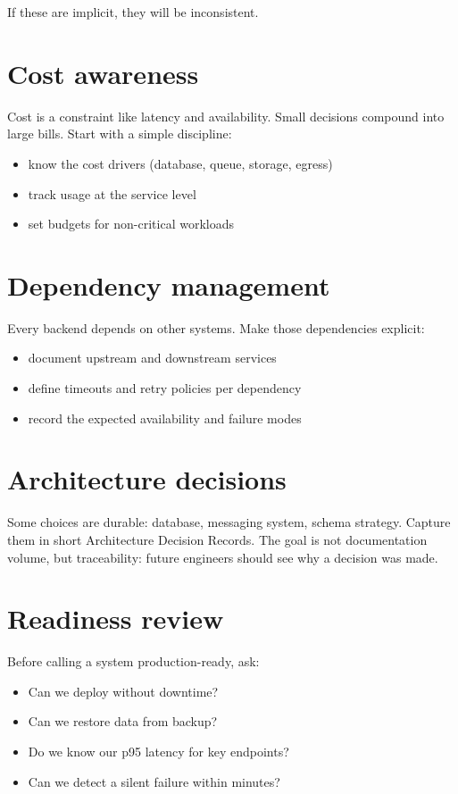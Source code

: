 If these are implicit, they will be inconsistent.

\section{Cost awareness}
Cost is a constraint like latency and availability.
Small decisions compound into large bills.
Start with a simple discipline:
\begin{itemize}[nosep]
  \item know the cost drivers (database, queue, storage, egress)
  \item track usage at the service level
  \item set budgets for non-critical workloads
\end{itemize}

\section{Dependency management}
Every backend depends on other systems.
Make those dependencies explicit:
\begin{itemize}[nosep]
  \item document upstream and downstream services
  \item define timeouts and retry policies per dependency
  \item record the expected availability and failure modes
\end{itemize}

\section{Architecture decisions}
Some choices are durable: database, messaging system, schema strategy.
Capture them in short Architecture Decision Records.
The goal is not documentation volume, but traceability:
future engineers should see why a decision was made.

\section{Readiness review}
Before calling a system production-ready, ask:
\begin{itemize}[nosep]
  \item Can we deploy without downtime?
  \item Can we restore data from backup?
  \item Do we know our p95 latency for key endpoints?
  \item Can we detect a silent failure within minutes?
\end{itemize}

